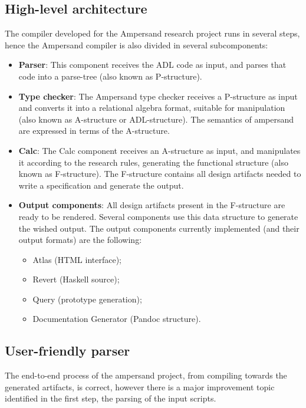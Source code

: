\subsection{High-level architecture}
\label{subsec:architecture}
The compiler developed for the Ampersand research project runs in several steps, hence the Ampersand compiler is also divided in several subcomponents:
%
%
%
%
\begin{itemize}
	\item \textbf{Parser}: This component receives the ADL code as input, and parses that code into a parse-tree (also known as P-structure).
	\item \textbf{Type checker}: The Ampersand type checker receives a P-structure as input and converts it into a relational algebra format, suitable for manipulation (also known as A-structure or ADL-structure).
		 The semantics of ampersand are expressed in terms of the A-structure.
	\item \textbf{Calc}: The Calc component receives an A-structure as input, and manipulates it according to the research rules, generating the functional structure (also known as F-structure).
		The F-structure contains all design artifacts needed to write a specification and generate the output.
	\item \textbf{Output components}: All design artifacts present in the F-structure are ready to be rendered.
		Several components use this data structure to generate the wished output.
		The output components currently implemented (and their output formats) are the following: 
		\begin{itemize}
			\item Atlas (HTML interface);
			\item Revert (Haskell source);
			\item Query (prototype generation);
			\item Documentation Generator (Pandoc structure).
		\end{itemize}
\end{itemize}

\subsection{User-friendly parser}
The end-to-end process of the ampersand project, from compiling towards the generated artifacts, is correct, however there is a major improvement topic identified in the first step, the parsing of the input scripts.

